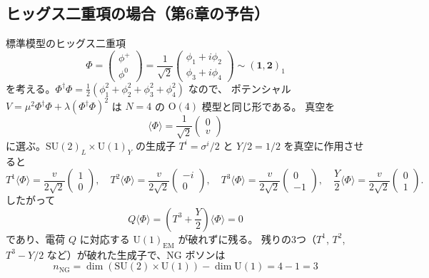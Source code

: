 \documentclass[uplatex,dvipdfmx,a4paper,11pt,openany]{jsbook}
\numberwithin{equation}{chapter}
\theoremstyle{definition}
\theoremstyle{plain}
\theoremstyle{remark}
\newcommand{\SU}{\mathrm{SU}}
\newcommand{\U}{\mathrm{U}}
\begin{document}
\subsection{ヒッグス二重項の場合（第6章の予告）}
標準模型のヒッグス二重項
\begin{equation}
\Phi=\begin{pmatrix}\phi^+\\ \phi^0\end{pmatrix}
=\frac{1}{\sqrt2}\begin{pmatrix}\phi_1+i\phi_2\\ \phi_3+i\phi_4\end{pmatrix}
\sim(\mathbf1,\mathbf2)_{1}
\end{equation}
を考える。$\Phi^\dagger\Phi=\frac12(\phi_1^2+\phi_2^2+\phi_3^2+\phi_4^2)$ なので、
ポテンシャル $V=\mu^2\Phi^\dagger\Phi+\lambda(\Phi^\dagger\Phi)^2$ は $N=4$ の $\mathrm O(4)$ 模型と同じ形である。
真空を
\begin{equation}
\langle\Phi\rangle=\frac{1}{\sqrt2}\begin{pmatrix}0\\ v\end{pmatrix}
\end{equation}
に選ぶ。$\SU(2)_L\times\U(1)_Y$ の生成子 $T^i=\sigma^i/2$ と $Y/2=1/2$ を真空に作用させると
\begin{equation}
T^1\langle\Phi\rangle=\frac{v}{2\sqrt2}\begin{pmatrix}1\\0\end{pmatrix},\quad
T^2\langle\Phi\rangle=\frac{v}{2\sqrt2}\begin{pmatrix}-i\\0\end{pmatrix},\quad
T^3\langle\Phi\rangle=\frac{v}{2\sqrt2}\begin{pmatrix}0\\-1\end{pmatrix},\quad
\frac Y2\langle\Phi\rangle=\frac{v}{2\sqrt2}\begin{pmatrix}0\\1\end{pmatrix}.
\end{equation}
したがって
\begin{equation}
Q\langle\Phi\rangle=\left(T^3+\frac Y2\right)\langle\Phi\rangle=0
\end{equation}
であり、電荷 $Q$ に対応する $\U(1)_{\mathrm{EM}}$ が破れずに残る。
残りの3つ（$T^1$, $T^2$, $T^3-Y/2$ など）が破れた生成子で、NG ボソンは
\begin{equation}
n_{\mathrm{NG}}=\dim(\SU(2)\times\U(1))-\dim\U(1)=4-1=3
\end{equation}
\end{document}
